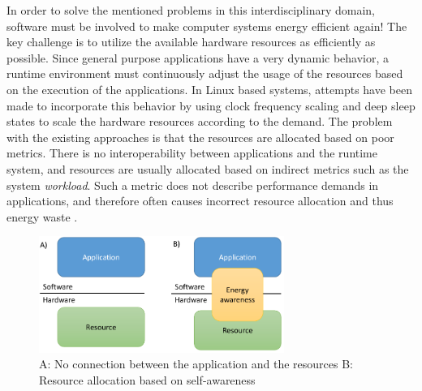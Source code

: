 \documentclass{article}
\begin{document}
In order to solve the mentioned problems in this interdisciplinary domain, software must be involved to make computer systems energy efficient again!
The key challenge is to utilize the available hardware resources as efficiently as possible.
Since general purpose applications have a very dynamic behavior, a runtime environment must continuously adjust the usage of the resources based on the execution of the applications.
In Linux based systems, attempts have been made to incorporate this behavior by using clock frequency scaling and deep sleep states to scale the hardware resources according to the demand. 
The problem with the existing approaches is that the resources are allocated based on poor metrics.
There is no interoperability between applications and the runtime system, and resources are usually allocated based on indirect metrics such as the system \textit{workload}.
Such a metric does not describe performance demands in applications, and therefore often causes incorrect resource allocation and thus energy waste \cite{HolmbackaDasip, HolmbackaHipeac}.
\smallskip

\begin{figure}
    \includegraphics[width=8.0cm]{fig/EAS_Overview.png}
  \caption{A: No connection between the application and the resources B: Resource allocation based on self-awareness}
  \label{fig:EAS}
\end{figure}
\end{document}
